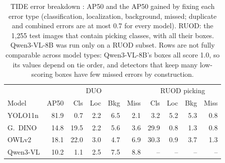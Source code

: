 \begin{table}[t]
\centering
\small
\setlength{\tabcolsep}{2.2pt}
\begin{tabular}{lrrrrr|rrrr}
\toprule
 & \multicolumn{5}{c|}{DUO} & \multicolumn{4}{c}{RUOD picking} \\
Model & AP50 & Cls & Loc & Bkg & Miss & Cls & Loc & Bkg & Miss \\
\midrule
YOLO11n & 81.9 & 0.7 & 2.2 & 6.5 & 2.1 & 3.2 & 5.2 & 5.3 & 0.8 \\
G.\ DINO & 14.8 & 19.5 & 2.2 & 5.6 & 3.6 & 29.9 & 0.8 & 1.3 & 0.8 \\
OWLv2 & 18.1 & 22.0 & 3.0 & 4.7 & 6.9 & 30.3 & 0.9 & 3.7 & 1.3 \\
Qwen3-VL & 10.2 & 1.1 & 2.5 & 7.5 & 8.8 & -- & -- & -- & -- \\
\bottomrule
\end{tabular}
\caption{TIDE error breakdown \citep{bolya2020tide}: AP50 and the AP50 gained by fixing each error type (classification, localization, background, missed; duplicate and combined errors are at most 0.7 for every model). RUOD: the 1{,}255 test images that contain picking classes, with all their boxes. Qwen3-VL-8B was run only on a RUOD subset. Rows are not fully comparable across model types: Qwen3-VL-8B's boxes all score 1.0, so its values depend on tie order, and detectors that keep many low-scoring boxes have few missed errors by construction.}
\label{tab:tide}
\end{table}
